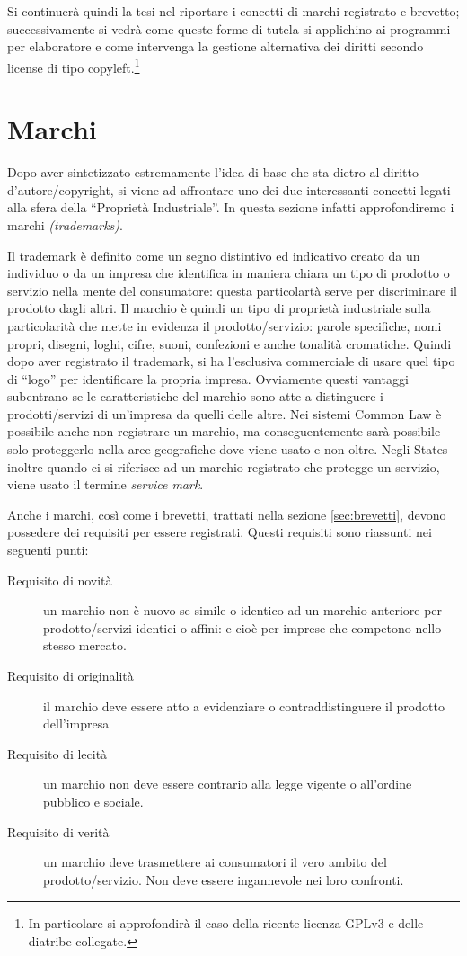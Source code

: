 Si continuerà quindi la tesi nel riportare i concetti di marchi registrato e brevetto; successivamente si vedrà come queste forme di tutela si applichino ai programmi per elaboratore e come intervenga la gestione alternativa dei diritti secondo license di tipo copyleft.\footnote{In particolare si approfondirà il caso della ricente licenza GPLv3 e delle diatribe collegate.}


\section{Marchi}
Dopo aver sintetizzato estremamente l'idea di base che sta dietro al diritto d'autore/copyright, si viene ad affrontare uno dei due interessanti concetti legati alla sfera della ``Proprietà Industriale''. In questa sezione infatti approfondiremo i marchi \textit{(trademarks)}.

Il trademark è definito come un segno distintivo ed indicativo creato da un individuo o da un impresa che identifica in maniera chiara un tipo di prodotto o servizio nella mente del consumatore: questa particolartà serve per discriminare il prodotto dagli altri. Il marchio è quindi un tipo di proprietà industriale sulla particolarità che mette in evidenza il prodotto/servizio: parole specifiche, nomi propri, disegni, loghi, cifre, suoni, confezioni e anche tonalità cromatiche. Quindi dopo aver registrato il trademark, si ha l'esclusiva commerciale di usare quel tipo di ``logo'' per identificare la propria impresa. Ovviamente questi vantaggi subentrano se le caratteristiche del marchio sono atte a distinguere i prodotti/servizi di un'impresa da quelli delle altre. Nei sistemi Common Law è possibile anche non registrare un marchio, ma conseguentemente sarà possibile solo proteggerlo nella aree geografiche dove viene usato e non oltre. Negli States inoltre quando ci si riferisce ad un marchio registrato che protegge un servizio, viene usato il termine \textit{service mark}.

Anche i marchi, così come i brevetti, trattati nella sezione \ref{sec:brevetti}, devono possedere dei requisiti per essere registrati. Questi requisiti sono riassunti nei seguenti punti:
\begin{description}
 \item[Requisito di novità] un marchio non è nuovo se simile o identico ad un marchio anteriore per prodotto/servizi identici o affini: e cioè per imprese che competono nello stesso mercato.
 \item[Requisito di originalità] il marchio deve essere atto a evidenziare o contraddistinguere il prodotto dell'impresa
 \item[Requisito di lecità] un marchio non deve essere contrario alla legge vigente o all'ordine pubblico e sociale.
 \item[Requisito di verità] un marchio deve trasmettere ai consumatori il vero ambito del prodotto/servizio. Non deve essere ingannevole nei loro confronti.
 \end{description}

